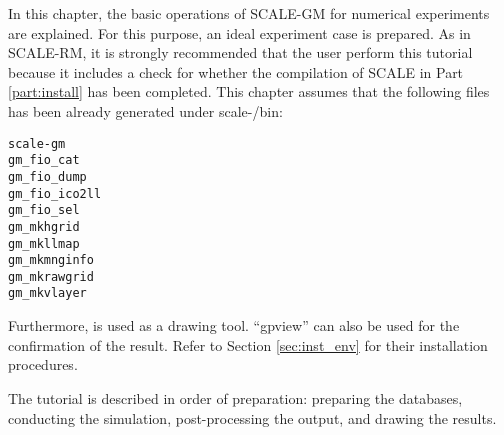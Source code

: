 
In this chapter, the basic operations of SCALE-GM for numerical experiments
are explained. For this purpose, an ideal experiment case is prepared. As in
SCALE-RM, it is strongly recommended that the user perform this tutorial
because it includes a check for whether the compilation of SCALE  in Part
\ref{part:install} has been completed. This chapter assumes that the following
files has been already generated under scale-{\version}/bin:
\begin{alltt}
  scale-gm
  gm_fio_cat 
  gm_fio_dump 
  gm_fio_ico2ll
  gm_fio_sel
  gm_mkhgrid
  gm_mkllmap
  gm_mkmnginfo
  gm_mkrawgrid 
  gm_mkvlayer
\end{alltt}
Furthermore, \grads is used as a drawing tool. ``gpview'' can also be used for the confirmation of the result. Refer to Section \ref{sec:inst_env} for their installation procedures.

The tutorial is described in order of preparation: preparing the databases, conducting the simulation, post-processing the output, and drawing the results.


%



